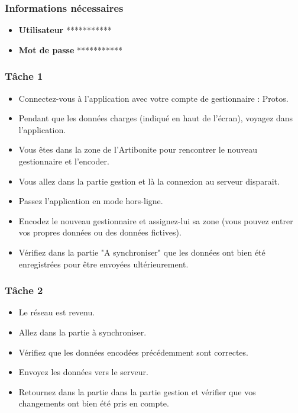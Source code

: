 \documentclass{EPL-master-thesis-covers-FR}
\begin{document}
				\subsubsection*{Informations nécessaires}
					\begin{itemize}[noitemsep, label={}]
						\item \textbf{Utilisateur} ***********
						\item \textbf{Mot de passe} ***********
					\end{itemize}

					
				\subsubsection*{Tâche 1}
					\begin{itemize}
						\item Connectez-vous à l’application avec votre compte de gestionnaire : Protos.
						\item Pendant que les données charges (indiqué en haut de l’écran), voyagez dans l’application.
						\item Vous êtes dans la zone de l’Artibonite pour rencontrer le nouveau gestionnaire et l’encoder.
						\item Vous allez dans la partie gestion et là la connexion au serveur disparait.
						\item Passez l’application en mode hors-ligne.
						\item Encodez le nouveau gestionnaire et assignez-lui sa zone (vous pouvez entrer vos propres données ou des données fictives).
						\item Vérifiez dans la partie "A synchroniser" que les données ont bien été enregistrées pour être envoyées ultérieurement.
					\end{itemize}
					
				\subsubsection*{Tâche 2}
					\begin{itemize}
						\item Le réseau est revenu.
						\item Allez dans la partie à synchroniser.
						\item Vérifiez que les données encodées précédemment sont correctes. 
						\item Envoyez les données vers le serveur. 
						\item Retournez dans la partie dans la partie gestion et vérifier que vos changements ont bien été pris en compte. 
					\end{itemize}
			
\end{document}
